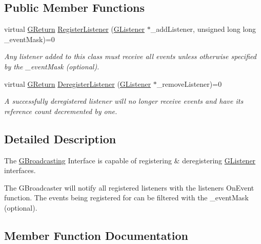 \subsection*{Public Member Functions}
\begin{DoxyCompactItemize}
\item 
virtual \hyperlink{namespaceGW_a67a839e3df7ea8a5c5686613a7a3de21}{G\+Return} \hyperlink{classGW_1_1CORE_1_1GBroadcasting_a293251421ba1169016f722df2f5b573b}{Register\+Listener} (\hyperlink{classGW_1_1CORE_1_1GListener}{G\+Listener} $\ast$\+\_\+add\+Listener, unsigned long long \+\_\+event\+Mask)=0
\begin{DoxyCompactList}\small\item\em Any listener added to this class must receive all events unless otherwise specified by the \+\_\+event\+Mask (optional). \end{DoxyCompactList}\item 
virtual \hyperlink{namespaceGW_a67a839e3df7ea8a5c5686613a7a3de21}{G\+Return} \hyperlink{classGW_1_1CORE_1_1GBroadcasting_afd6b1f41b646c668b1fcce2580681dd5}{Deregister\+Listener} (\hyperlink{classGW_1_1CORE_1_1GListener}{G\+Listener} $\ast$\+\_\+remove\+Listener)=0
\begin{DoxyCompactList}\small\item\em A successfully deregistered listener will no longer receive events and have its reference count decremented by one. \end{DoxyCompactList}\end{DoxyCompactItemize}


\subsection{Detailed Description}
The \hyperlink{classGW_1_1CORE_1_1GBroadcasting}{G\+Broadcasting} Interface is capable of registering \& deregistering \hyperlink{classGW_1_1CORE_1_1GListener}{G\+Listener} interfaces. 

The G\+Broadcaster will notify all registered listeners with the listeners On\+Event function. The events being registered for can be filtered with the \+\_\+event\+Mask (optional). 

\subsection{Member Function Documentation}
